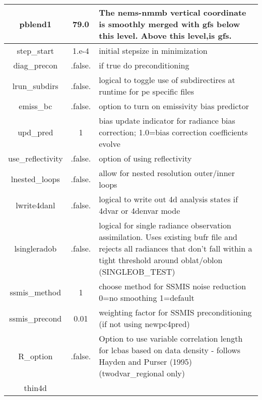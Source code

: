 \begin{table}[h]
\begin{tabular}{| c | c | p{9cm} |}
  \hline
  pblend1 & 79.0 & The nems-nmmb vertical coordinate is smoothly merged with gfs below this level. Above this level,is gfs. \\
  \hline
  step\_start & 1.e-4 & initial stepsize in minimization \\
  \hline
  diag\_precon & .false. & if true do preconditioning \\
  \hline
  lrun\_subdirs & .false. & logical to toggle use of subdirectires at runtime for pe specific files \\
  \hline
  emiss\_bc & .false. & option to turn on emissivity bias predictor \\
  \hline
  upd\_pred & 1 & bias update indicator for radiance bias correction; 1.0=bias correction coefficients evolve \\
  \hline
  use\_reflectivity	& .false. & option of using reflectivity \\
  \hline 
  lnested\_loops & .false. & allow for nested resolution outer/inner loops \\
  \hline
  lwrite4danl & .false. & logical to write out 4d analysis states if 4dvar or 4denvar mode \\
  \hline
  lsingleradob & .false. & logical for single radiance observation assimilation. Uses existing bufr file and rejects all radiances that don't fall within a tight threshold around oblat/oblon (SINGLEOB\_TEST) \\
  \hline
  ssmis\_method & 1 & choose method for SSMIS noise reduction 0=no smoothing 1=default \\
  \hline
  ssmis\_precond & 0.01 & weighting factor for SSMIS preconditioning (if not using newpc4pred) \\
  \hline
  R\_option & .false. & Option to use variable correlation length for lcbas based on data density - follows Hayden and Purser (1995) (twodvar\_regional only) \\
  \hline
  thin4d & & \\
  \hline
  \end{tabular}
\end{table}


